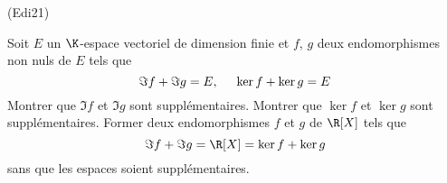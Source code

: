 \begin{tiny}(Edi21)\end{tiny} Soit $E$ un $\K$-espace vectoriel de dimension finie et $f$, $g$ deux endomorphismes non nuls de $E$ tels que
\begin{displaymath}
 \Im f + \Im g = E, \hspace{0.5cm} \ker f + \ker g = E 
\end{displaymath}
Montrer que $\Im f$ et $\Im g$  sont supplémentaires. Montrer que $\ker f$ et $\ker g$  sont supplémentaires. Former deux endomorphismes $f$ et $g$ de $\R[X]$ tels que
\begin{displaymath}
  \Im f + \Im g = \R[X] = \ker f + \ker g
\end{displaymath}
sans que les espaces soient supplémentaires.